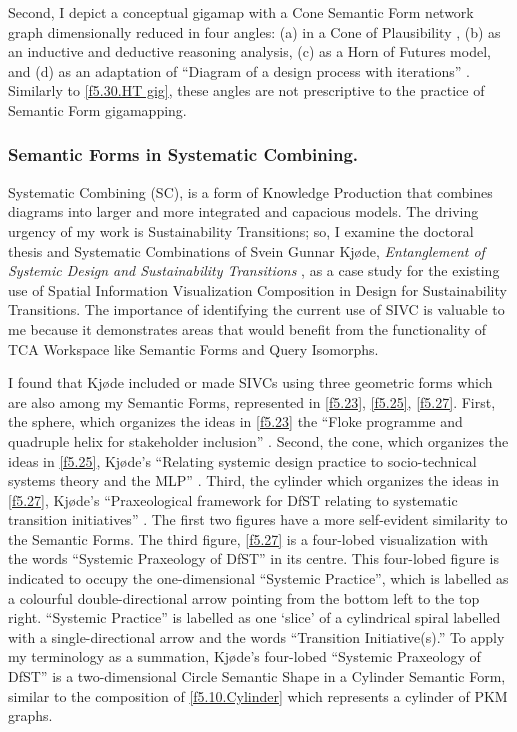 Second, I depict a conceptual gigamap with a Cone Semantic Form network graph dimensionally reduced in four angles: (a) in a Cone of Plausibility \citep{bezold_overview_1993}, (b) as an inductive and deductive reasoning analysis, (c) as a Horn of Futures model, and (d) as an adaptation of “Diagram of a design process with iterations” \citep[p. 343]{sevaldson_designing_2022} \citep{sevaldson_designing_2022-1}. Similarly to \autoref{f5.30.HT gig}, these angles are not prescriptive to the practice of Semantic Form gigamapping. 

\subsubsection{Semantic Forms in Systematic Combining.}
Systematic Combining (SC), is a form of Knowledge Production that combines diagrams into larger and more integrated and capacious models. The driving urgency of my work is Sustainability Transitions; so, I examine the doctoral thesis and Systematic Combinations of Svein Gunnar Kjøde, \textit{Entanglement of Systemic Design and Sustainability Transitions} \citep{kjode_entanglement_2024}, as a case study for the existing use of Spatial Information Visualization Composition in Design for Sustainability Transitions. The importance of identifying the current use of SIVC is valuable to me because it demonstrates areas that would benefit from the functionality of TCA Workspace like Semantic Forms and Query Isomorphs. 

I found that Kjøde included or made SIVCs using three geometric forms which are also among my Semantic Forms, represented in \autoref{f5.23}, \autoref{f5.25},  \autoref{f5.27}. First, the sphere, which organizes the ideas in \autoref{f5.23} the “Floke programme and quadruple helix for stakeholder inclusion” \citep[p. 125]{kjode_entanglement_2024}. Second, the cone, which organizes the ideas in \autoref{f5.25}, Kjøde’s “Relating systemic design practice to socio-technical systems theory and the MLP” \citep[p. 123]{kjode_entanglement_2024}. Third, the cylinder which organizes the ideas in \autoref{f5.27}, Kjøde’s “Praxeological framework for DfST relating to systematic transition initiatives” \citep[p. 144]{kjode_entanglement_2024}. The first two figures have a more self-evident similarity to the Semantic Forms. The third figure, \autoref{f5.27} is a four-lobed visualization with the words “Systemic Praxeology of DfST” in its centre. This four-lobed figure is indicated to occupy the one-dimensional “Systemic Practice”, which is labelled as a colourful double-directional arrow pointing from the bottom left to the top right. “Systemic Practice” is labelled as one ‘slice’ of a cylindrical spiral labelled with a single-directional arrow and the words “Transition Initiative(s).” To apply my terminology as a summation, Kjøde’s four-lobed “Systemic Praxeology of DfST” is a two-dimensional Circle Semantic Shape in a Cylinder Semantic Form, similar to the composition of \autoref{f5.10.Cylinder} which represents a cylinder of PKM graphs. 

